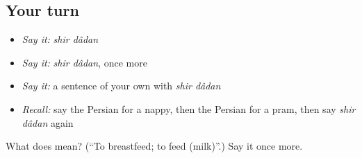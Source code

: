 \subsection*{Your turn}
\begin{itemize}
\raggedright
  \item \emph{Say it:} \emph{shir dâdan}
  \item \emph{Say it:} \emph{shir dâdan}, once more
  \item \emph{Say it:} a sentence of your own with \emph{shir dâdan}
  \item \emph{Recall:} say the Persian for a nappy, then the Persian for a pram, then say \emph{shir dâdan} again
\end{itemize}

\begin{tcolorbox}[breakable,colback=teal!4,colframe=teal!35!black,title={Before you move on}]
What does   mean? (\textquotedblleft{}To breastfeed; to feed (milk)\textquotedblright{}.) Say it once more.
\end{tcolorbox}
